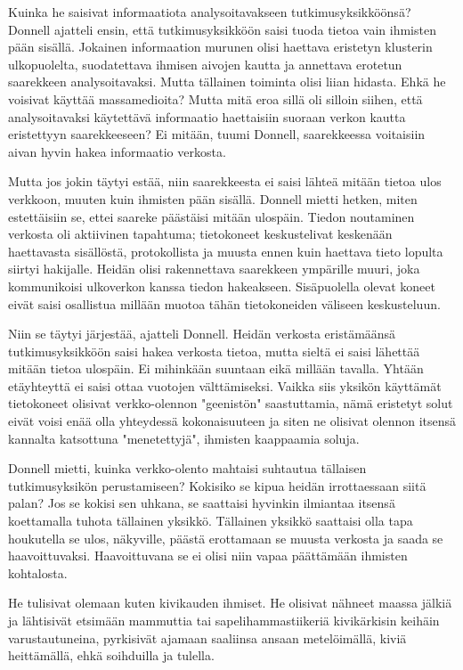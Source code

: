 Kuinka he saisivat informaatiota analysoitavakseen tutkimusyksikköönsä? Donnell ajatteli ensin, että tutkimusyksikköön saisi tuoda tietoa vain ihmisten pään sisällä. Jokainen informaation murunen olisi haettava eristetyn klusterin ulkopuolelta, suodatettava ihmisen aivojen kautta ja annettava erotetun saarekkeen analysoitavaksi. Mutta tällainen toiminta olisi liian hidasta. Ehkä he voisivat käyttää massamedioita? Mutta mitä eroa sillä oli silloin siihen, että analysoitavaksi käytettävä informaatio haettaisiin suoraan verkon kautta eristettyyn saarekkeeseen? Ei mitään, tuumi Donnell, saarekkeessa voitaisiin aivan hyvin hakea informaatio verkosta.


Mutta jos jokin täytyi estää, niin saarekkeesta ei saisi lähteä mitään tietoa ulos verkkoon, muuten kuin ihmisten pään sisällä. Donnell mietti hetken, miten estettäisiin se, ettei saareke päästäisi mitään ulospäin. Tiedon noutaminen verkosta oli aktiivinen tapahtuma; tietokoneet keskustelivat keskenään haettavasta sisällöstä, protokollista ja muusta ennen kuin haettava tieto lopulta siirtyi hakijalle. Heidän olisi rakennettava saarekkeen ympärille muuri, joka kommunikoisi ulkoverkon kanssa tiedon hakeakseen. Sisäpuolella olevat koneet eivät saisi osallistua millään muotoa tähän tietokoneiden väliseen keskusteluun.


Niin se täytyi järjestää, ajatteli Donnell. Heidän verkosta eristämäänsä tutkimusyksikköön saisi hakea verkosta tietoa, mutta sieltä ei saisi lähettää mitään tietoa ulospäin. Ei mihinkään suuntaan eikä millään tavalla. Yhtään etäyhteyttä ei saisi ottaa vuotojen välttämiseksi. Vaikka siis yksikön käyttämät tietokoneet olisivat verkko-olennon "geenistön" saastuttamia, nämä eristetyt solut eivät voisi enää olla yhteydessä kokonaisuuteen ja siten ne olisivat olennon itsensä kannalta katsottuna "menetettyjä", ihmisten kaappaamia soluja.


Donnell mietti, kuinka verkko-olento mahtaisi suhtautua tällaisen tutkimusyksikön perustamiseen? Kokisiko se kipua heidän irrottaessaan siitä palan? Jos se kokisi sen uhkana, se saattaisi hyvinkin ilmiantaa itsensä koettamalla tuhota tällainen yksikkö. Tällainen yksikkö saattaisi olla tapa houkutella se ulos, näkyville, päästä erottamaan se muusta verkosta ja saada se haavoittuvaksi. Haavoittuvana se ei olisi niin vapaa päättämään ihmisten kohtalosta.


He tulisivat olemaan kuten kivikauden ihmiset. He olisivat nähneet maassa jälkiä ja lähtisivät etsimään mammuttia tai sapelihammastiikeriä kivikärkisin keihäin varustautuneina, pyrkisivät ajamaan saaliinsa ansaan metelöimällä, kiviä heittämällä, ehkä soihduilla ja tulella.


